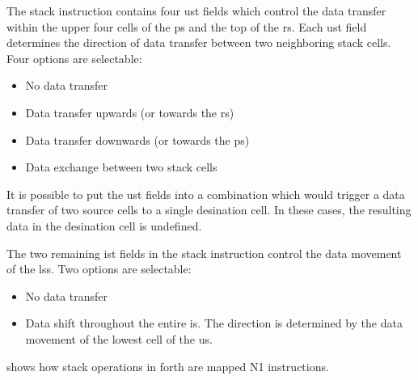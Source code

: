 The stack instruction contains four \gls{ust} fields which control the data transfer within the upper four
\glspl{cell} of the \gls{ps} and the top of the \gls{rs}. Each \gls{ust} field determines the direction of
data transfer between two neighboring stack \glspl{cell}. Four options are selectable:
\begin{itemize}
  \item No data transfer
  \item Data transfer upwards (or towards the \gls{rs})
  \item Data transfer downwards (or towards the \gls{ps})
  \item Data exchange between two stack \glspl{cell}
\end{itemize}
It is possible to put the \gls{ust} fields into a combination which would trigger a data transfer of two
source \glspl{cell} to a single desination \gls{cell}. In these cases, the resulting data in the desination
\gls{cell} is undefined.

\begin{samepage}
The two remaining \gls{ist} fields in the stack instruction control the data movement of the \glspl{ls}.
Two options are selectable:
\begin{itemize}
  \item No data transfer
  \item Data shift throughout the entire \gls{is}. The direction is determined by the data movement of the lowest
        cell of the \gls{us}.
\end{itemize}
\end{samepage}

 shows how \gls{stack} operations in \gls{forth} are mapped N1 instructions. 

